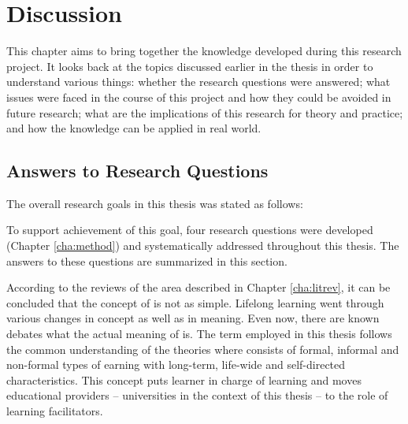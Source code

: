 \chapter{Discussion\label{cha:discussion}}
This chapter aims to bring together the knowledge developed during this research
project. It looks back at the topics discussed earlier in the thesis in order to
understand various things: whether the research questions were answered; what
issues were faced in the course of this project and how they could be avoided in
future research; what are the implications of this research for theory and
practice; and how the knowledge can be applied in real world.


\section{Answers to Research Questions}

The overall research goals in this thesis was stated as follows:


To support achievement of this goal, four research questions were developed
(Chapter \ref{cha:method}) and systematically addressed throughout this thesis.
The answers to these questions are summarized in this section.


According to the reviews of the area described in Chapter \ref{cha:litrev}, it
can be concluded that the concept of \LLLs is not as simple. Lifelong learning
went through various changes in concept as well as in meaning. Even now,
there are known debates what the actual meaning of \LLLs is. The term employed
in this thesis follows the common understanding of the theories where \LLLs
consists of formal, informal and non-formal types of  earning with long-term,
life-wide and self-directed characteristics. This concept puts learner in charge
of learning and moves educational providers -- universities in the context of
this thesis -- to the role of learning facilitators.

